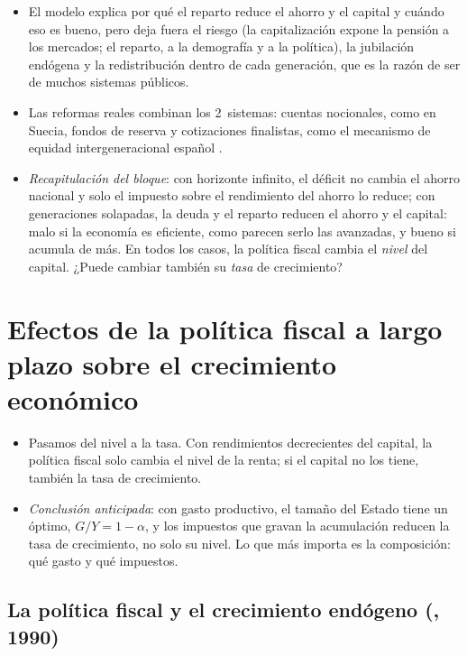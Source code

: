 \documentclass[11pt]{article}
\begin{document}
\begin{itemize}
\item El modelo explica por qué el reparto reduce el ahorro y el capital y cuándo eso es bueno, pero deja fuera el riesgo (la capitalización expone la pensión a los mercados; el reparto, a la demografía y a la política), la jubilación endógena y la redistribución dentro de cada generación, que es la razón de ser de muchos sistemas públicos.
\item Las reformas reales combinan los 2~sistemas: cuentas nocionales, como en Suecia, fondos de reserva y cotizaciones finalistas, como el mecanismo de equidad intergeneracional español .
\item \emph{Recapitulación del bloque}: con horizonte infinito, el déficit no cambia el ahorro nacional y solo el impuesto sobre el rendimiento del ahorro lo reduce; con generaciones solapadas, la deuda y el reparto reducen el ahorro y el capital: malo si la economía es eficiente, como parecen serlo las avanzadas, y bueno si acumula de más. En todos los casos, la política fiscal cambia el \emph{nivel} del capital. ¿Puede cambiar también su \emph{tasa} de crecimiento?
\end{itemize}

\section{Efectos de la política fiscal a largo plazo\cortetitulo{} sobre el crecimiento económico}\label{sec:crecimiento}

\begin{itemize}
\item Pasamos del nivel a la tasa. Con rendimientos decrecientes del capital, la política fiscal solo cambia el nivel de la renta; si el capital no los tiene, también la tasa de crecimiento.
\item \emph{Conclusión anticipada}: con gasto productivo, el tamaño del Estado tiene un óptimo, $G/Y=1-\alpha$, y los impuestos que gravan la acumulación reducen la tasa de crecimiento, no solo su nivel. Lo que más importa es la composición: qué gasto y qué impuestos.
\end{itemize}

\subsection{La política fiscal y el crecimiento endógeno (, 1990)}\label{sec:barro}
\end{document}
